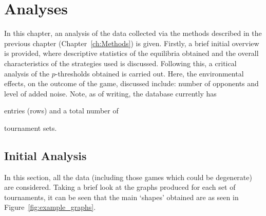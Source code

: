 \chapter{Analyses}\label{ch:Analyses}
In this chapter, an analysis of the data collected via the methods described in
the previous chapter (Chapter~\ref{ch:Methods}) is given. Firstly, a brief
initial overview is provided, where descriptive statistics of the equilibria
obtained and the overall characteristics of the strategies used is discussed.
Following this, a critical analysis of the \(p\)-thresholds obtained is carried
out. Here, the environmental effects, on the outcome of the game, discussed
include: number of opponents and level of added noise. Note, as of writing, the database currently has 

entries (rows) and a total number of 

tournament sets. 

\section{Initial Analysis}\label{sec:Initial_Analysis}
In this section, all the data (including those games which could be degenerate)
are considered. Taking a brief look at the graphs produced for each set of
tournaments, it can be seen that the main `shapes' obtained are as seen in
Figure~\ref{fig:example_graphs}.

